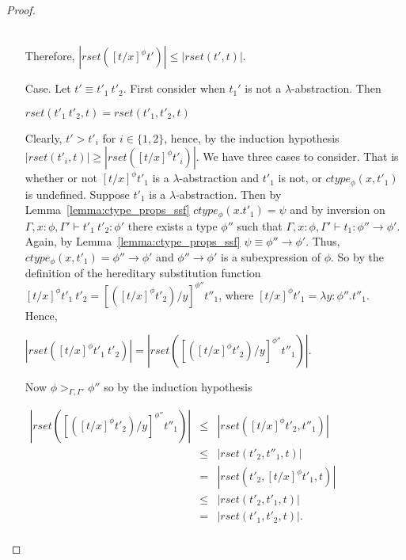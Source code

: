 \begin{proof}
\begin{itemize}
\begin{center}
\begin{math}
\begin{array}{lll}
      \end{array}
    \end{math}
  \end{center}
  Therefore, $|rset([t/x]^\phi t')| \leq |rset(t',t)|$.
  
\item[Case.] Let $t' \equiv t'_1\ t'_2$.  First consider when $t_1'$ is not a $\lambda$-abstraction. Then
  \begin{center}
    $rset(t'_1\ t'_2, t) = rset(t'_1, t'_2, t)$
  \end{center}  
  Clearly,  $t' > t'_i$ for $i \in \{1,2\}$, hence, by the induction hypothesis $|rset(t'_i,t)| \geq |rset([t/x]^\phi t'_i)|$.  
  We have three cases to consider.  That is whether or not $[t/x]^\phi t'_1$ is a $\lambda$-abstraction and $t'_1$ is not, or
  $ctype_\phi(x,t'_1)$ is undefined.  
  Suppose $t'_1$ is a $\lambda$-abstraction.
  Then by Lemma~\ref{lemma:ctype_props_ssf} $ctype_\phi(x.t'_1) = \psi$ and by inversion on $\Gamma,x:\phi,\Gamma' \vdash t'_1\ t'_2:\phi'$
  there exists a type $\phi''$ such that $\Gamma,x:\phi,\Gamma' \vdash t_1:\phi'' \to \phi'$.  Again, by Lemma~\ref{lemma:ctype_props_ssf}
  $\psi \equiv \phi'' \to \phi'$. Thus, $ctype_\phi(x,t'_1) = \phi'' \to \phi'$ and $\phi'' \to \phi'$ is a subexpression of $\phi$.
  So by the definition of the hereditary substitution function $[t/x]^\phi t'_1\ t'_2 = [([t/x]^\phi t'_2)/y]^{\phi''} t''_1$, where
  $[t/x]^\phi t'_1 = \lambda y:\phi''.t''_1$.  Hence,
  \begin{center}
    \begin{math}
      |rset([t/x]^\phi t'_1\ t'_2)| = |rset([([t/x]^\phi t'_2)/y]^{\phi''} t''_1)|.
    \end{math}
  \end{center}
  Now $\phi >_{\Gamma,\Gamma'} \phi''$ so by the induction hypothesis 
  \begin{center}
    \begin{math}
      \begin{array}{lll}
        |rset([([t/x]^\phi t'_2)/y]^{\phi''} t''_1)| & \leq & |rset([t/x]^\phi t'_2, t''_1)|\\
        & \leq & |rset(t'_2, t''_1, t)|\\
        & = & |rset(t'_2, [t/x]^\phi t'_1, t)|\\
        & \leq & |rset(t'_2, t'_1, t)|\\
        & = & |rset(t'_1, t'_2, t)|.\\
      \end{array}
    \end{math}
  \end{center}


\end{itemize}
\end{proof}
